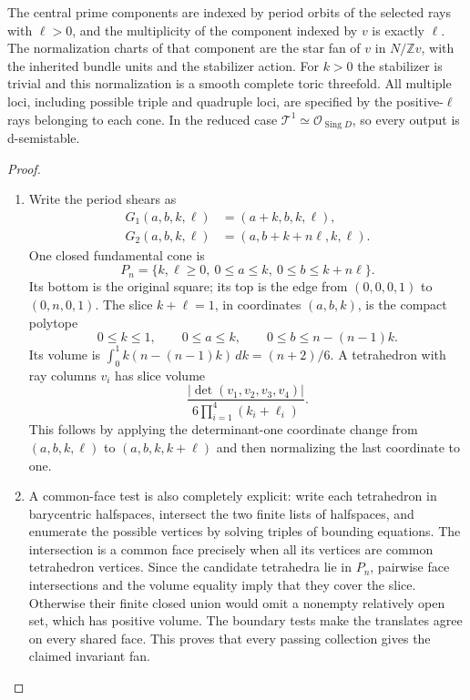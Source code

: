 \begin{theorem}
The central prime components are indexed by period orbits of
the selected rays with $\ell>0$, and the multiplicity of the
component indexed by $v$ is exactly $\ell$. The normalization
charts of that component are the star fan of $v$ in
$N/\mathbb Zv$, with the inherited bundle units and the
stabilizer action. For $k>0$ the stabilizer is trivial and this
normalization is a smooth complete toric threefold. All
multiple loci, including possible triple and quadruple loci,
are specified by the positive-$\ell$ rays belonging to each
cone. In the reduced case
$\mathcal T^1\simeq\mathcal O_{\operatorname{Sing}D}$,
so every output is d-semistable.
\end{theorem}


\begin{proof}
\begin{enumerate}[label=\arabic*.,leftmargin=*]
\item Write the period shears as
\begin{align*}
 G_1(a,b,k,\ell)&=(a+k,b,k,\ell),\\
 G_2(a,b,k,\ell)&=(a,b+k+n\ell,k,\ell).
\end{align*}
One closed fundamental cone is
\[
 P_n=\{k,\ell\geq0,\ 0\leq a\leq k,
                    \ 0\leq b\leq k+n\ell\}.
\]
Its bottom is the original square; its top is the edge from
$(0,0,0,1)$ to $(0,n,0,1)$. The slice $k+\ell=1$, in
coordinates $(a,b,k)$, is the compact polytope
\[
 0\leq k\leq1,\qquad0\leq a\leq k,
 \qquad0\leq b\leq n-(n-1)k.
\]
Its volume is
$\int_0^1 k(n-(n-1)k)\,dk=(n+2)/6$.
A tetrahedron with ray columns $v_i$ has slice volume
\[
 \frac{|\det(v_1,v_2,v_3,v_4)|}
      {6\prod_{i=1}^4(k_i+\ell_i)}.
 \tag{A.24b}
\]
This follows by applying the determinant-one coordinate
change from $(a,b,k,\ell)$ to $(a,b,k,k+\ell)$ and then
normalizing the last coordinate to one.

\item A common-face test is also completely explicit: write each
tetrahedron in barycentric halfspaces, intersect the two
finite lists of halfspaces, and enumerate the possible
vertices by solving triples of bounding equations. The
intersection is a common face precisely when all its vertices
are common tetrahedron vertices. Since the candidate
tetrahedra lie in $P_n$, pairwise face intersections and the
volume equality imply that they cover the slice. Otherwise
their finite closed union would omit a nonempty relatively
open set, which has positive volume. The boundary tests make
the translates agree on every shared face. This proves that
every passing collection gives the claimed invariant fan.


\end{enumerate}
\end{proof}
